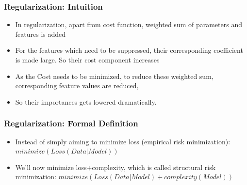 	

\begin{frame}[fragile]\frametitle{Regularization: Intuition}
	\begin{itemize}
	\item In regularization, apart from cost function, weighted sum of parameters and features is added
	\item For the features which need to be suppressed, their corresponding coefficient is made large. So their cost component increases
	\item As the Cost needs to be minimized, to reduce these weighted sum, corresponding feature values are reduced, 
	\item So their importances gets lowered dramatically.
	\end{itemize}
\end{frame}



\begin{frame}[fragile]\frametitle{Regularization: Formal Definition}


	\begin{itemize}
	\item Instead of simply aiming to minimize loss (empirical risk minimization): $minimize(Loss(Data|Model))$ 
	\item We'll now minimize loss+complexity, which is called structural risk minimization: $minimize(Loss(Data|Model) + complexity(Model))$
	\end{itemize}
	
\end{frame}

